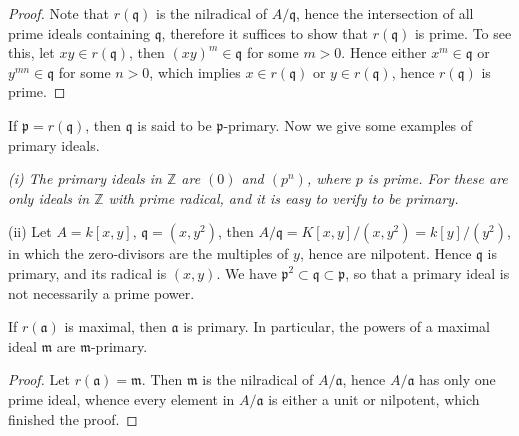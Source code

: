 \begin{proof}
Note that $r(\mathfrak{q})$ is the nilradical of $A/\mathfrak{q}$, hence the intersection of all prime ideals containing $\mathfrak{q}$, therefore it suffices to show that $r(\mathfrak{q})$ is prime. To see this, let $xy\in r(\mathfrak{q})$, then $(xy)^m\in\mathfrak{q}$ for some $m>0$. Hence either $x^m\in\mathfrak{q}$ or $y^{mn}\in\mathfrak{q}$ for some $n>0$, which implies $x\in r(\mathfrak{q})$ or $y\in r(\mathfrak{q})$, hence $r(\mathfrak{q})$ is prime.
\end{proof}
If $\mathfrak{p}=r(\mathfrak{q})$, then $\mathfrak{q}$ is said to be $\mathfrak{p}$-primary. Now we give some examples of primary ideals.
\begin{example}\em
(i) The primary ideals in $\mathbb{Z}$ are $(0)$ and $(p^n)$, where $p$ is prime. For these are only ideals in $\mathbb{Z}$ with prime radical, and it is easy to verify to be primary.\par
(ii) Let $A=k[x,y]$, $\mathfrak{q}=(x,y^2)$, then $A/\mathfrak{q}=K[x,y]/(x,y^2)=k[y]/(y^2)$, in which the zero-divisors are the multiples of $y$, hence are nilpotent. Hence $\mathfrak{q}$ is primary, and its radical is $(x,y)$. We have $\mathfrak{p}^2\subset\mathfrak{q}\subset\mathfrak{p}$, so that a primary ideal is not necessarily a prime power.
\end{example}
\begin{proposition}
If $r(\mathfrak{a})$ is maximal, then $\mathfrak{a}$ is primary. In particular, the powers of a maximal ideal $\mathfrak{m}$ are $\mathfrak{m}$-primary.
\end{proposition}
\begin{proof}
Let $r(\mathfrak{a})=\mathfrak{m}$. Then $\mathfrak{m}$ is the nilradical of $A/\mathfrak{a}$, hence $A/\mathfrak{a}$ has only one prime ideal, whence every element in $A/\mathfrak{a}$ is either a unit or nilpotent, which finished the proof.
\end{proof}
